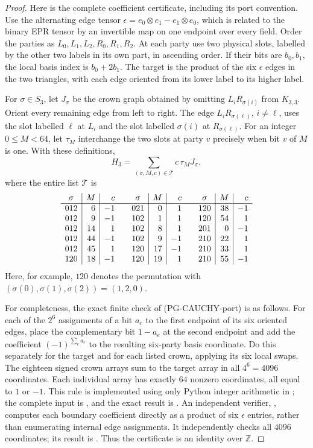 \begin{proof}
Here is the complete coefficient certificate, including its port convention.
Use the alternating edge tensor
$\epsilon=e_0\otimes e_1-e_1\otimes e_0$, which is related to the binary
EPR tensor by an invertible map on one endpoint over every field. Order the
parties as $L_0,L_1,L_2,R_0,R_1,R_2$. At each party use two physical slots,
labelled by the other two labels in its own part, in ascending order.
If their bits are $b_0,b_1$, the local basis index is $b_0+2b_1$.
The target is the product of the six $\epsilon$ edges in the two triangles,
with each edge oriented from its lower label to its higher label.

For $\sigma\in S_3$, let $J_\sigma$ be the crown graph obtained by omitting
$L_iR_{\sigma(i)}$ from $K_{3,3}$. Orient every remaining edge from left to
right. The edge $L_iR_{\sigma(\ell)}$, $i\ne\ell$, uses the slot labelled
$\ell$ at $L_i$ and the slot labelled $\sigma(i)$ at $R_{\sigma(\ell)}$.
For an integer $0\leq M<64$, let $\tau_M$ interchange the two slots at
party $v$ precisely when bit $v$ of $M$ is one. With these definitions,
\[
 H_3=\sum_{(\sigma,M,c)\in\mathcal T}c\,\tau_MJ_\sigma,
 \tag{PG-CAUCHY-port}
\]
where the entire list $\mathcal T$ is
\[
\begin{array}{c|r|r@{\qquad}c|r|r@{\qquad}c|r|r}
 \sigma&M&c&\sigma&M&c&\sigma&M&c\\\hline
 012&6&-1&021&0&1&120&38&-1\\
 012&9&-1&102&1&1&120&54&1\\
 012&14&1&102&8&1&201&0&-1\\
 012&44&-1&102&9&-1&210&22&1\\
 012&45&1&120&17&-1&210&33&1\\
 120&18&-1&120&19&1&210&55&-1
\end{array}
\]
Here, for example, $120$ denotes the permutation with
$(\sigma(0),\sigma(1),\sigma(2))=(1,2,0)$.

For completeness, the exact finite check of (PG-CAUCHY-port) is as follows.
For each of the $2^6$ assignments of a bit $a_e$ to the first endpoint of
its six oriented edges, place the complementary bit $1-a_e$ at the second
endpoint and add the coefficient $(-1)^{\sum_e a_e}$ to the resulting
six-party basis coordinate. Do this separately for the target and for each
listed crown, applying its six local swaps. The eighteen signed crown
arrays sum to the target array in all $4^6=4096$ coordinates. Each individual
array has exactly $64$ nonzero coordinates, all equal to $1$ or $-1$.
This rule is implemented using only Python integer arithmetic in
; the complete input is
, and the exact result is
.
An independent verifier,
, computes each boundary
coefficient directly as a product of six $\epsilon$ entries, rather than
enumerating internal edge assignments. It independently checks all
$4096$ coordinates; its result is
.
Thus the certificate is an identity over $\mathbb Z$.


\end{proof}
